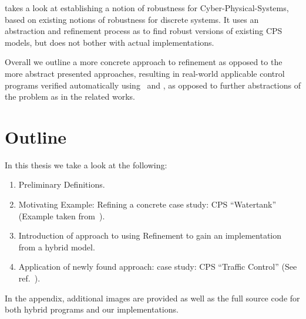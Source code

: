 \cite{Robustness} takes a look at establishing a notion of robustness for Cyber-Physical-Systems, based on existing notions of robustness for discrete systems. It uses an abstraction and refinement process as to find robust versions of existing CPS models, but does not bother with actual implementations.

Overall we outline a more concrete approach to refinement as opposed to the more abstract presented approaches, resulting in real-world applicable control programs verified automatically using \key~and \keym, as opposed to further abstractions of the problem as in the related works.

\section{Outline}
\label{sec:Outline}

In this thesis we take a look at the following:

\begin{enumerate}[label=\bfseries \Roman*:]

\item Preliminary Definitions.
\item Motivating Example: Refining a concrete case study: CPS ``Watertank'' (Example taken from~\cite{keymaeraGuide}).
\item Introduction of approach to using Refinement to gain an implementation from a hybrid model.
\item Application of newly found approach: case study: CPS ``Traffic Control'' (See ref.~\cite{TrafficControl}).
\end{enumerate}

In the appendix, additional images are provided as well as the full source code for both hybrid programs and our implementations.